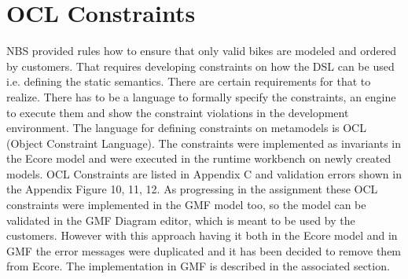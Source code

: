 \section{OCL Constraints}
\label{sec.ocl_constraints}

\noindent
NBS provided rules how to ensure that only valid bikes are modeled and 
ordered by customers. That requires developing constraints on how the 
DSL can be used i.e. defining the static semantics. There are certain 
requirements for that to realize. There has to be a language to 
formally specify the constraints, an engine to execute them and show 
the constraint violations in the development environment. The language 
for defining constraints on metamodels is OCL (Object Constraint 
Language). The constraints were implemented as invariants in the Ecore 
model and were executed in the runtime workbench on newly created models. 
OCL Constraints are listed in Appendix C and validation errors shown 
in the Appendix Figure 10, 11, 12. As progressing in the assignment 
these OCL constraints were implemented in the GMF model too, so the 
model can be validated in the GMF Diagram editor, which is meant 
to be used by the customers. However with this approach having it 
both in the Ecore model and in GMF the error messages were duplicated 
and it has been decided to remove them from Ecore. The implementation 
in GMF is described in the associated section.
